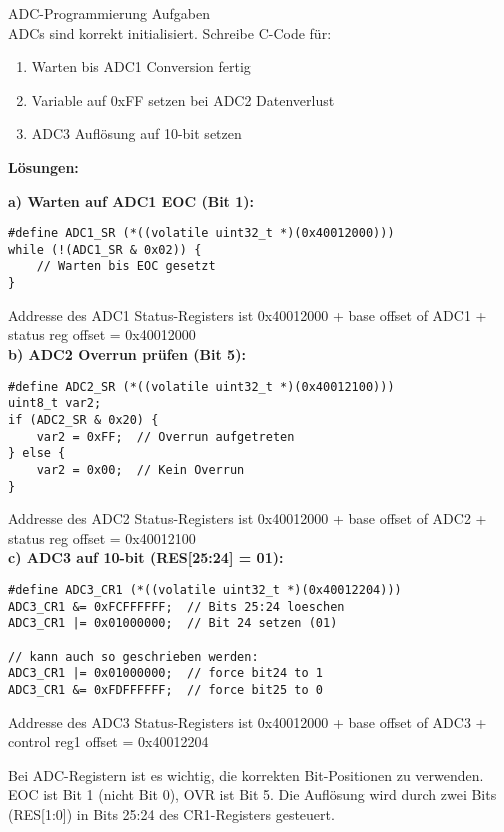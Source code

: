 \begin{example2}{ADC-Programmierung Aufgaben}\\
    ADCs sind korrekt initialisiert. Schreibe C-Code für:
    \begin{enumerate}
        \item Warten bis ADC1 Conversion fertig
        \item Variable auf 0xFF setzen bei ADC2 Datenverlust
        \item ADC3 Auflösung auf 10-bit setzen
    \end{enumerate}
    
    \tcblower
    
    \textbf{Lösungen:}
    
    \textbf{a) Warten auf ADC1 EOC (Bit 1):}
\begin{lstlisting}[style=basesmol]
#define ADC1_SR (*((volatile uint32_t *)(0x40012000)))
while (!(ADC1_SR & 0x02)) {
    // Warten bis EOC gesetzt
}
\end{lstlisting}
Addresse des ADC1 Status-Registers ist 0x40012000 + base offset of ADC1 + status reg offset = 0x40012000
\vspace{2mm}\\

    \textbf{b) ADC2 Overrun prüfen (Bit 5):}
\begin{lstlisting}[style=basesmol]
#define ADC2_SR (*((volatile uint32_t *)(0x40012100)))
uint8_t var2;
if (ADC2_SR & 0x20) {
    var2 = 0xFF;  // Overrun aufgetreten
} else {
    var2 = 0x00;  // Kein Overrun
}
\end{lstlisting}
Addresse des ADC2 Status-Registers ist 0x40012000 + base offset of ADC2 + status reg offset = 0x40012100
\vspace{2mm}\\

    \textbf{c) ADC3 auf 10-bit (RES[25:24] = 01):}
\begin{lstlisting}[style=basesmol]
#define ADC3_CR1 (*((volatile uint32_t *)(0x40012204)))
ADC3_CR1 &= 0xFCFFFFFF;  // Bits 25:24 loeschen
ADC3_CR1 |= 0x01000000;  // Bit 24 setzen (01)

// kann auch so geschrieben werden:
ADC3_CR1 |= 0x01000000;  // force bit24 to 1
ADC3_CR1 &= 0xFDFFFFFF;  // force bit25 to 0
\end{lstlisting}
Addresse des ADC3 Status-Registers ist 0x40012000 + base offset of ADC3 + control reg1 offset = 0x40012204
\end{example2}

\begin{remark}
    Bei ADC-Registern ist es wichtig, die korrekten Bit-Positionen zu verwenden. EOC ist Bit 1 (nicht Bit 0), OVR ist Bit 5. Die Auflösung wird durch zwei Bits (RES[1:0]) in Bits 25:24 des CR1-Registers gesteuert.
\end{remark}